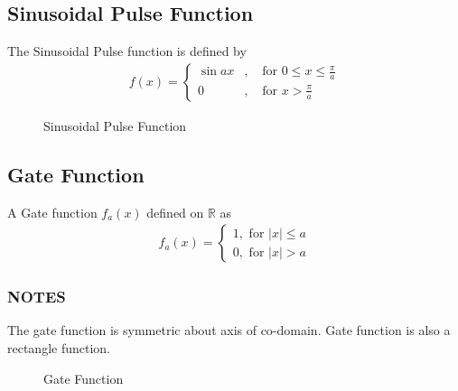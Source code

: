 \documentclass[11pt]{report}
\newcommand{\sps}{\\[0.2cm]}
\newcommand{\dsp}{\displaystyle}
\newcommand{\real}{ \mathbb{R}}
\begin{document}
	\subsection{Sinusoidal Pulse Function}
	The Sinusoidal Pulse function is defined by
	\begin{eqnarray}
		f(x) = \left\{
		\begin{array}{lll}
			\sin ax &,&\text{ for } 0 \leq x \leq \dsp\frac{\pi}{a}\sps
			0 &,& \text{ for } x > \dsp\frac{\pi}{a}
		\end{array}\right. \label{eq:2_7}
	\end{eqnarray}
	
	\begin{figure}
		\centering
		\caption{Sinusoidal Pulse Function}\label{fig:2_2}
	\end{figure}
	
	\subsection{Gate Function}
	A Gate function $f_a(x)$ defined on $\real$ as
	\begin{eqnarray}
		f_a(x) = \left\{
		\begin{array}{l}
			1, \text{ for } |x| \leq a\\
			0, \text{ for } |x| > a
		\end{array}\right.
	\end{eqnarray}
	
	\subsubsection{NOTES}
	The gate function is symmetric about axis of co-domain. Gate function is also a rectangle function.
	
	\begin{figure}
		\centering
		\caption{Gate Function}\label{fig:2_3}
	\end{figure}
	
\end{document}
